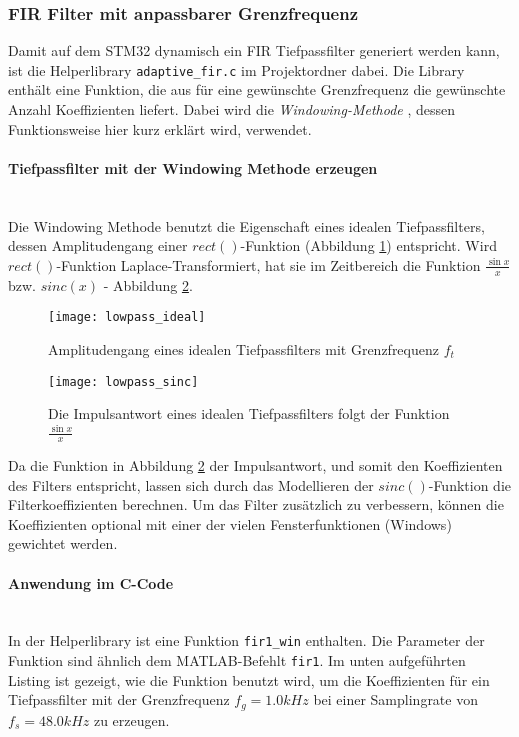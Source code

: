\subsubsection{FIR Filter mit anpassbarer Grenzfrequenz}
\label{sec:LibFIRAdaptive}

Damit auf dem STM32 dynamisch ein FIR Tiefpassfilter generiert werden kann, ist die Helperlibrary \texttt{adaptive\_fir.c} im Projektordner dabei.
Die Library enthält eine Funktion, die aus für eine gewünschte Grenzfrequenz die gewünschte Anzahl Koeffizienten liefert.
Dabei wird die \textit{Windowing-Methode} \cite{FIR-Windowing}, dessen Funktionsweise hier kurz erklärt wird, verwendet.
\\
\paragraph{Tiefpassfilter mit der Windowing Methode erzeugen}\vspace{-0.3cm}\\
Die Windowing Methode benutzt die Eigenschaft eines idealen Tiefpassfilters, dessen Amplitudengang einer $rect()$-Funktion (Abbildung \ref{pic:lowpass_ideal}) entspricht.
Wird $rect()$-Funktion Laplace-Transformiert, hat sie im Zeitbereich die Funktion $\frac{\sin{x}}{x}$ bzw. $sinc(x)$ - Abbildung \ref{pic:lowpass_sinc}.

\begin{figure}[H]
	\centering
	\texttt{[image: lowpass\_ideal]}
	\caption{Amplitudengang eines idealen Tiefpassfilters mit Grenzfrequenz $f_t$ \cite{FIR-Windowing}}
	\label{pic:lowpass_ideal}
\end{figure}

\begin{figure}[H]
	\centering
	\texttt{[image: lowpass\_sinc]}
	\caption{Die Impulsantwort eines idealen Tiefpassfilters folgt der Funktion $\frac{\sin{x}}{x}$ \cite{FIR-Windowing}}
	\label{pic:lowpass_sinc}
\end{figure}

Da die Funktion in Abbildung \ref{pic:lowpass_sinc} der Impulsantwort, und somit den Koeffizienten des Filters entspricht, lassen sich durch das Modellieren der $sinc()$-Funktion die Filterkoeffizienten berechnen.
Um das Filter zusätzlich zu verbessern, können die Koeffizienten optional mit einer der vielen Fensterfunktionen (Windows) gewichtet werden.
\\
\paragraph{Anwendung im C-Code}\vspace{-0.3cm}\\
In der Helperlibrary ist eine Funktion \texttt{fir1\_win} enthalten.
Die Parameter der Funktion sind ähnlich dem MATLAB-Befehlt \texttt{fir1}.
Im unten aufgeführten Listing ist gezeigt, wie die Funktion benutzt wird, um die Koeffizienten für ein Tiefpassfilter mit der Grenzfrequenz $f_g=1.0\si{kHz}$ bei einer Samplingrate von $f_s=48.0\si{kHz}$ zu erzeugen.\\

